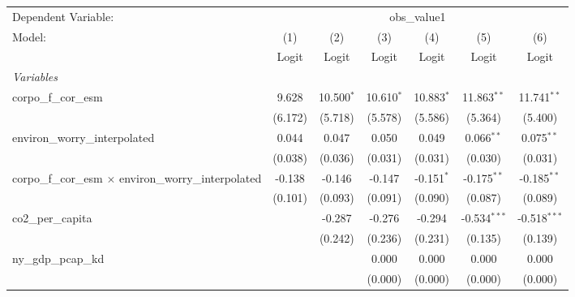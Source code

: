 
\begingroup
\centering
\begin{tabular}{lcccccc}
   \toprule
   Dependent Variable: & \multicolumn{6}{c}{obs\_value1}\\
   Model:                                                         & (1)     & (2)          & (3)          & (4)           & (5)            & (6)\\  
                                                                  &  Logit  & Logit        & Logit        & Logit         & Logit          & Logit\\  
   \midrule
   \emph{Variables}\\
   corpo\_f\_cor\_esm                                             & 9.628   & 10.500$^{*}$ & 10.610$^{*}$ & 10.883$^{*}$  & 11.863$^{**}$  & 11.741$^{**}$\\   
                                                                  & (6.172) & (5.718)      & (5.578)      & (5.586)       & (5.364)        & (5.400)\\   
   environ\_worry\_interpolated                                   & 0.044   & 0.047        & 0.050        & 0.049         & 0.066$^{**}$   & 0.075$^{**}$\\   
                                                                  & (0.038) & (0.036)      & (0.031)      & (0.031)       & (0.030)        & (0.031)\\   
   corpo\_f\_cor\_esm $\times$ environ\_worry\_interpolated       & -0.138  & -0.146       & -0.147       & -0.151$^{*}$  & -0.175$^{**}$  & -0.185$^{**}$\\   
                                                                  & (0.101) & (0.093)      & (0.091)      & (0.090)       & (0.087)        & (0.089)\\   
   co2\_per\_capita                                               &         & -0.287       & -0.276       & -0.294        & -0.534$^{***}$ & -0.518$^{***}$\\   
                                                                  &         & (0.242)      & (0.236)      & (0.231)       & (0.135)        & (0.139)\\   
   ny\_gdp\_pcap\_kd                                              &         &              & 0.000        & 0.000         & 0.000          & 0.000\\   
                                                                  &         &              & (0.000)      & (0.000)       & (0.000)        & (0.000)\\   

\end{tabular}
